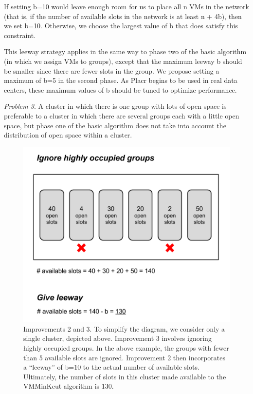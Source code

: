\documentclass[11pt]{article}
\begin{document}
If setting b=10 would leave enough room for us to place all n VMs in the network (that is, if the number of available slots in the network is at least n + 4b), then we set b=10.  Otherwise, we choose the largest value of b that does satisfy this constraint.

This leeway strategy applies in the same way to phase two of the basic algorithm (in which we assign VMs to groups), except that the maximum leeway b should be smaller since there are fewer slots in the group.  We propose setting a maximum of b=5 in the second phase.  As Placr begins to be used in real data centers, these maximum values of b should be tuned to optimize performance.

\textit{Problem 3}. A cluster in which there is one group with lots of open space is preferable to a cluster in which there are several groups each with a little open space, but phase one of the basic algorithm does not take into account the distribution of open space within a cluster.

\begin{figure}
  \centering
\includegraphics[scale=0.7]{occupiedgroups.png}

 \caption{ Improvements 2 and 3.  To simplify the diagram, we consider only a single cluster, depicted above.  Improvement 3 involves ignoring highly occupied groups.  In the above example, the groups with fewer than 5 available slots are ignored.  Improvement 2 then incorporates a ``leeway'' of b=10 to the actual number of available slots.  Ultimately, the number of slots in this cluster made available to the VMMinKcut algorithm is 130.}

\end{figure}
\end{document}
